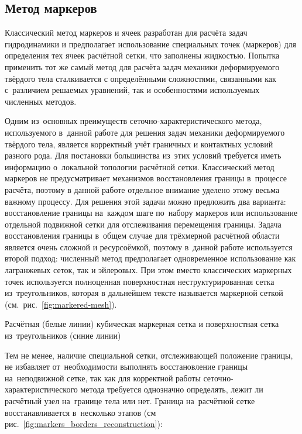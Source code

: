 \documentclass[thesis.tex]{subfiles}
\begin{document}
    \subsection{Метод маркеров}

    Классический метод маркеров и ячеек \cite{harlow1965numerical} разработан для расчёта задач гидродинамики и предполагает
    использование специальных точек (маркеров) для определения тех ячеек расчётной сетки, что заполнены жидкостью.
    Попытка применить тот же самый метод для расчёта задач механики деформируемого твёрдого тела сталкивается с
    определёнными сложностями, связанными как с~различием решаемых уравнений, так и особенностями используемых численных
    методов.

    Одним из~основных преимуществ сеточно-характеристического метода, используемого в~данной работе для решения задач
    механики деформируемого твёрдого тела, является корректный учёт граничных и контактных условий разного рода. Для
    постановки большинства из~этих условий требуется иметь информацию о~локальной топологии расчётной сетки.
    Классический метод маркеров не предусматривает механизмов восстановления границы в~процессе расчёта, поэтому в
    данной работе отдельное внимание уделено этому весьма важному процессу. Для решения этой задачи можно предложить два
    варианта: восстановление границы на~каждом шаге по~набору маркеров или использование отдельной подвижной сетки для
    отслеживания перемещения границы. Задача восстановления границы в~общем случае для трёхмерной расчётной области
    является очень сложной и ресурсоёмкой, поэтому в~данной работе используется второй подход: численный метод
    предполагает одновременное использование как лагранжевых сеток, так и эйлеровых. При этом вместо классических
    маркерных точек используется полноценная поверхностная неструктурированная сетка из~треугольников, которая в
    дальнейшем тексте называется маркерной сеткой (см.~рис.~\ref{fig:markered-mesh}).

        {Расчётная (белые линии) кубическая маркерная сетка и поверхностная сетка из~треугольников (синие линии)}

    Тем не менее, наличие специальной сетки, отслеживающей положение границы, не избавляет от~необходимости выполнять
    восстановление границы на~неподвижной сетке, так как для корректной работы сеточно-характеристического метода
    требуется однозначно определять, лежит ли расчётный узел на~границе тела или нет. Граница на~расчётной сетке
    восстанавливается в~несколько этапов (см рис.~\ref{fig:markers_borders_reconstruction}):
\end{document}
